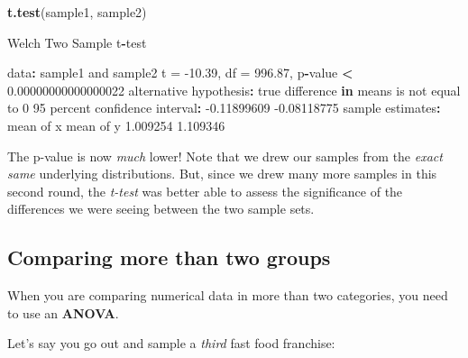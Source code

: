 \documentclass[
]{book}
\newenvironment{Shaded}{\begin{snugshade}}{\end{snugshade}}
\newcommand{\ControlFlowTok}[1]{\textcolor[rgb]{0.13,0.29,0.53}{\textbf{#1}}}
\newcommand{\DecValTok}[1]{\textcolor[rgb]{0.00,0.00,0.81}{#1}}
\newcommand{\FloatTok}[1]{\textcolor[rgb]{0.00,0.00,0.81}{#1}}
\newcommand{\KeywordTok}[1]{\textcolor[rgb]{0.13,0.29,0.53}{\textbf{#1}}}
\newcommand{\NormalTok}[1]{#1}
\newcommand{\OperatorTok}[1]{\textcolor[rgb]{0.81,0.36,0.00}{\textbf{#1}}}
\newcommand{\StringTok}[1]{\textcolor[rgb]{0.31,0.60,0.02}{#1}}
\begin{document}
\begin{Shaded}
\begin{Highlighting}[]
\KeywordTok{t.test}\NormalTok{(sample1, }
\NormalTok{       sample2)}

\NormalTok{    Welch Two Sample t}\OperatorTok{-}\NormalTok{test}

\NormalTok{data}\OperatorTok{:}\StringTok{  }\NormalTok{sample1 and sample2}
\NormalTok{t =}\StringTok{ }\FloatTok{-10.39}\NormalTok{, df =}\StringTok{ }\FloatTok{996.87}\NormalTok{, p}\OperatorTok{-}\NormalTok{value }\OperatorTok{<}\StringTok{ }\FloatTok{0.00000000000000022}
\NormalTok{alternative hypothesis}\OperatorTok{:}\StringTok{ }\NormalTok{true difference }\ControlFlowTok{in}\NormalTok{ means is not equal to }\DecValTok{0}
\DecValTok{95}\NormalTok{ percent confidence interval}\OperatorTok{:}
\StringTok{ }\FloatTok{-0.11899609} \FloatTok{-0.08118775}
\NormalTok{sample estimates}\OperatorTok{:}
\NormalTok{mean of x mean of y }
 \FloatTok{1.009254}  \FloatTok{1.109346} 
\end{Highlighting}
\end{Shaded}

The p-value is now \emph{much} lower! Note that we drew our samples from the \emph{exact same} underlying distributions. But, since we drew many more samples in this second round, the \emph{t-test} was better able to assess the significance of the differences we were seeing between the two sample sets.

\hypertarget{comparing-more-than-two-groups}{%
\subsection*{Comparing more than two groups}\label{comparing-more-than-two-groups}}

When you are comparing numerical data in more than two categories, you need to use an \textbf{ANOVA}.

Let's say you go out and sample a \emph{third} fast food franchise:
\end{document}
